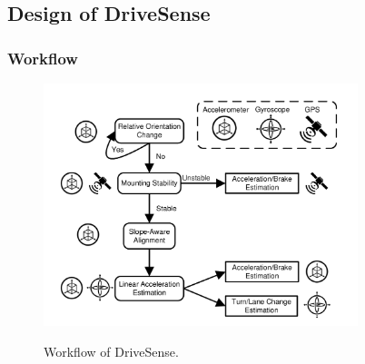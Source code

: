 



\subsection{Design of DriveSense}


\subsubsection{Workflow}

\begin{figure}[!htbp]
\begin{center}
\includegraphics[width=3.6in, angle=0]{Figs/DriveSense/system_flowchart.pdf}
\vspace{-0.2cm}
\caption{Workflow of DriveSense.}
\vspace{-0.6cm}
\label{workflow}
\end{center}
\end{figure}


